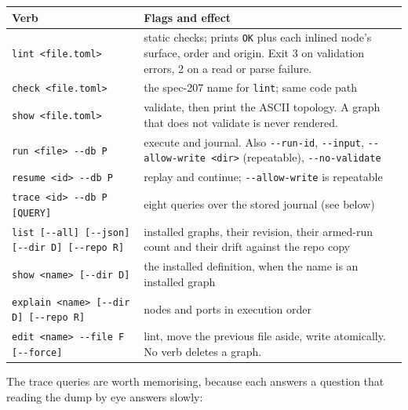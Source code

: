 \begin{center}
\begin{tabular}{@{}>{\raggedright\arraybackslash}p{}>{\raggedright\arraybackslash}p{}@{}}
  \toprule
  \textbf{Verb} & \textbf{Flags and effect} \\
  \midrule
  \texttt{lint <file.toml>} & static checks; prints \texttt{OK} plus each inlined node's
    surface, order and origin. Exit 3 on validation errors, 2 on a read or parse failure. \\
  \texttt{check <file.toml>} & the spec-207 name for \texttt{lint}; same code path \\
  \texttt{show <file.toml>} & validate, then print the ASCII topology. A graph that does not
    validate is never rendered. \\
  \texttt{run <file> -{}-db P} & execute and journal. Also \texttt{-{}-run-id},
    \texttt{-{}-input}, \texttt{-{}-allow-write <dir>} (repeatable), \texttt{-{}-no-validate} \\
  \texttt{resume <id> -{}-db P} & replay and continue; \texttt{-{}-allow-write} is repeatable \\
  \texttt{trace <id> -{}-db P [QUERY]} & eight queries over the stored journal (see below) \\
  \texttt{list [-{}-all] [-{}-json] [-{}-dir D] [-{}-repo R]} & installed graphs, their
    revision, their armed-run count and their drift against the repo copy \\
  \texttt{show <name> [-{}-dir D]} & the installed definition, when the name is an installed graph \\
  \texttt{explain <name> [-{}-dir D] [-{}-repo R]} & nodes and ports in execution order \\
  \texttt{edit <name> -{}-file F [-{}-force]} & lint, move the previous file aside, write
    atomically. No verb deletes a graph. \\
  \bottomrule
\end{tabular}
\end{center}

The trace queries are worth memorising, because each answers a question that reading the dump
by eye answers slowly:

